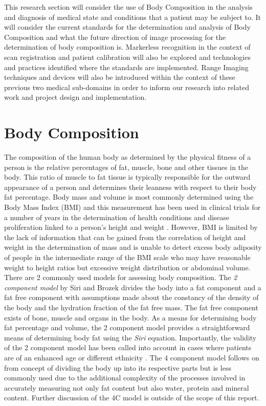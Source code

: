 This research section will consider the use of Body Composition in the analysis and diagnosis of medical state and conditions that a patient may be subject to. 
It will consider the current standards for the determination and analysis of Body Composition and what the future direction of image processing for the determination of body composition is.
Markerless recognition in the context of scan registration and patient calibration will also be explored and technologies and practices identified where the standards are implemented. 
Range Imaging techniques and devices will also be introduced within the context of these previous two medical sub-domains in order to inform our research into related work and project design and implementation.\\

\section{Body Composition}

The composition of the human body as determined by the physical fitness of a person is the relative percentages of fat, muscle, bone and other tissues in the body. 
This ratio of muscle to fat tissue is typically responsible for the outward appearance of a person and determines their leanness with respect to their body fat percentage. 
Body mass and volume is most commonly determined using the Body Mass Index (BMI) and this measurement has been used in clinical trials for a number of years in the determination of health conditions and disease proliferation linked to a person's height and weight \cite{Flegal2012}. However, BMI is limited by the lack of information that can be gained from the correlation of height and weight in the determination of mass and is unable to detect excess body adiposity of people in the intermediate range of the BMI scale who may have reasonable weight to height ratios but excessive weight distribution or abdominal volume. \\

There are 2 commonly used models for assessing body composition. The \emph{2 component model} by Siri and Brozek \cite{SiriAndBrozek} divides the body into a fat component and a fat free component with assumptions made about the constancy of the density of the body and the hydration fraction of the fat free mass. The fat free component exists of bone, muscle and organs in the body. As a means for determining body fat percentage and volume, the 2 component model provides a straightforward means of determining body fat using the \emph{Siri} equation. Importantly, the validity of the 2 component model has been called into account in cases where patients are of an enhanced age or different ethnicity \cite{Guerra2010, Wagner2001}. The 4 component model follows on from concept of dividing the body up into its respective parts but is less commonly used due to the additional complexity of the processes involved in accurately measuring not only fat content but also water, protein and mineral content. Further discussion of the 4C model is outside of the scope of this report. 

